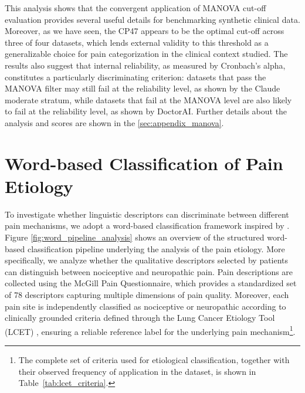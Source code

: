 \documentclass[preprint,12pt,authoryear]{elsarticle}
\newcommand{\ste}[1]{\textcolor{red}{[Stefano: #1]}}
\begin{document}
This analysis shows that the convergent application of MANOVA cut-off evaluation provides several useful details for benchmarking synthetic clinical data. Moreover, as we have seen, the CP47 appears to be the optimal cut-off across three of four datasets, which lends external validity to this threshold as a generalizable choice for pain categorization in the clinical context studied. The results also suggest that internal reliability, as measured by Cronbach's alpha, constitutes a particularly discriminating criterion: datasets that pass the MANOVA filter may still fail at the reliability level, as shown by the Claude moderate stratum, while datasets that fail at the MANOVA level are also likely to fail at the reliability level, as shown by DoctorAI. Further details about the analysis and scores are shown in the \ref{sec:appendix_manova}.



\section{Word-based Classification of Pain Etiology\label{sec:sec6}}

To investigate whether linguistic descriptors can discriminate between different pain mechanisms, we adopt a word-based classification framework inspired by \citep{wilkie2001nociceptive}. Figure \ref{fig:word_pipeline_analysis} shows an overview of the structured word-based classification pipeline underlying the analysis of the pain etiology. More specifically, we analyze whether the qualitative descriptors selected by patients can distinguish between nociceptive and neuropathic pain. Pain descriptions are collected using the McGill Pain Questionnaire, which provides a standardized set of 78 descriptors capturing multiple dimensions of pain quality. Moreover, each pain site is independently classified as nociceptive or neuropathic according to clinically grounded criteria defined through the Lung Cancer Etiology Tool (LCET) \citep{wilkie2001nociceptive}, ensuring a reliable reference label for the underlying pain mechanism\footnote{The complete set of criteria used for etiological classification, together with their observed frequency of application in the dataset, is shown in Table~\ref{tab:lcet_criteria}.}.
\end{document}
